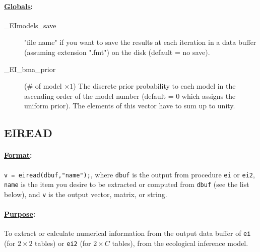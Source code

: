 \documentclass[11pt,titlepage]{article}
\begin{document}
\paragraph{\underline{Globals}:}
\begin{description}
\item[\_EImodels\_save] "file name" if you want to save the results at
  each iteration in a data buffer (assuming extension ".fmt") on the
  disk (default = no save).
  
\item[\_EI\_bma\_prior] ($\#$ of model $\times 1$) The discrete prior
  probability to each model in the ascending order of the model number
  (default = 0 which assigns the uniform prior). The elements of this
  vector have to sum up to unity.
\end{description}

\subsection{EIREAD} \label{eiread}

\paragraph{\underline{Format}:} \texttt{v = eiread(dbuf,"name");}, where
\texttt{dbuf} is the output from procedure \texttt{ei} or
\texttt{ei2}, \texttt{name} is the item you desire to be extracted or
computed from \texttt{dbuf} (see the list below), and \texttt{v} is
the output vector, matrix, or string.

\paragraph{\underline{Purpose}:}
To extract or calculate numerical information from the output data
buffer of \texttt{ei} (for $2\times 2$ tables) or \texttt{ei2} (for
$2\times C$ tables), from the ecological inference model.
\end{document}
